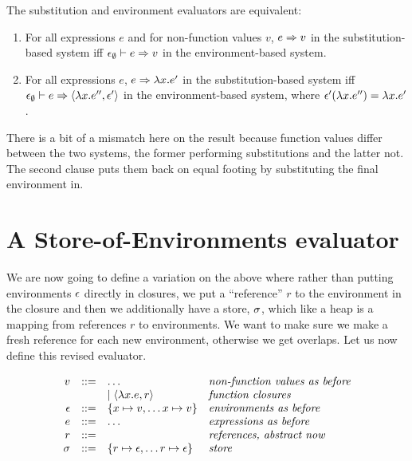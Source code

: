 \begin{lemma} The substitution and environment evaluators are equivalent:
\begin{enumerate}
  \item For all expressions $e$ and for non-function values $v$, $e \Rightarrow v$ in the substitution-based system iff $\epsilon_\emptyset \vdash e \Rightarrow v$ in the environment-based system.
  \item For all expressions $e$, $e \Rightarrow \lambda x.e'$ in the substitution-based system iff $\epsilon_\emptyset \vdash e \Rightarrow \langle\lambda x.e'', \epsilon'\rangle$ in the environment-based system, where $\epsilon'(\lambda x.e'') =\lambda x.e'$.
  \end{enumerate}
\end{lemma}
There is a bit of a mismatch here on the result because function values differ between the two systems, the former performing substitutions and the latter not.  The second clause puts them back on equal footing by substituting the final environment in.



\section{A Store-of-Environments evaluator}

We are now going to define a variation on the above where rather than putting environments $\epsilon$ directly in closures, we put a ``reference'' $r$ to the environment in the closure and then we additionally have a store, $\sigma$, which like a heap is a mapping from references $r$ to environments.  We want to make sure we make a fresh reference for each new environment, otherwise we get overlaps.  Let us now define this revised evaluator. 

$$
\begin{array}{rcll}
v &::=& \dots & \textit{non-function values as before}\\
  &   & \mid \lb \lambda x. e, r \rb  & \textit{function closures}\\
\env &::=& \{x \mapsto v, \dots x \mapsto v \}&\textit{environments as before}\\
e &::=& \dots & \textit{expressions as before}\\
r &::=& & \textit{references, abstract now}\\
\store &::=& \{r \mapsto \env, \dots r \mapsto \env\} & \textit{store}
%
\end{array}
$$
 
